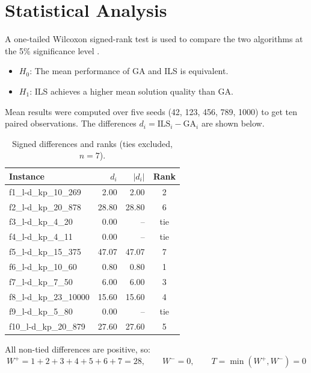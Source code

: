 \documentclass[12pt, a4paper]{article}
\begin{document}
\section{Statistical Analysis}

A one-tailed Wilcoxon signed-rank test is used to compare the two algorithms at the 5\% significance level \cite{notes}.

\begin{itemize}
    \item $H_0$: The mean performance of GA and ILS is equivalent.
    \item $H_1$: ILS achieves a higher mean solution quality than GA.
\end{itemize}

Mean results were computed over five seeds (42, 123, 456, 789, 1000) to get ten paired observations. The differences $d_i = \text{ILS}_i - \text{GA}_i$ are shown below.

\begin{table}[h]
\centering
\begin{tabular}{lrrc}
\toprule
\textbf{Instance} & \textbf{$d_i$} & \textbf{$|d_i|$} & \textbf{Rank} \\
\midrule
f1\_l-d\_kp\_10\_269   & 2.00  & 2.00  & 2 \\
f2\_l-d\_kp\_20\_878   & 28.80 & 28.80 & 6 \\
f3\_l-d\_kp\_4\_20     & 0.00  & --    & tie \\
f4\_l-d\_kp\_4\_11     & 0.00  & --    & tie \\
f5\_l-d\_kp\_15\_375   & 47.07 & 47.07 & 7 \\
f6\_l-d\_kp\_10\_60    & 0.80  & 0.80  & 1 \\
f7\_l-d\_kp\_7\_50     & 6.00  & 6.00  & 3 \\
f8\_l-d\_kp\_23\_10000 & 15.60 & 15.60 & 4 \\
f9\_l-d\_kp\_5\_80     & 0.00  & --    & tie \\
f10\_l-d\_kp\_20\_879  & 27.60 & 27.60 & 5 \\
\bottomrule
\end{tabular}
\caption{Signed differences and ranks (ties excluded, $n = 7$).}
\end{table}

All non-tied differences are positive, so:
\[
W^+ = 1+2+3+4+5+6+7 = 28, \qquad W^- = 0, \qquad T = \min(W^+, W^-) = 0
\]
\end{document}
